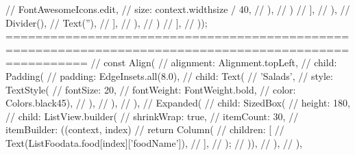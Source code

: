 //                           FontAwesomeIcons.edit,
//                           size: context.widthsize / 40,
//                         ),
//                       )
//                     ],
//                   ),
//                   Divider(),
//                   Text(''),
//                 ],
//               ),
//             )
//           ],
//         ));
=======================================================================================================
// const Align(
                //   alignment: Alignment.topLeft,
                //   child: Padding(
                //     padding: EdgeInsets.all(8.0),
                //     child: Text(
                //       'Salads',
                //       style: TextStyle(
                //           fontSize: 20,
                //           fontWeight: FontWeight.bold,
                //           color: Colors.black45),
                //     ),
                //   ),
                // ),
                // Expanded(
                //   child: SizedBox(
                //     height: 180,
                //     child: ListView.builder(
                //         shrinkWrap: true,
                //         itemCount: 30,
                //         itemBuilder: ((context, index) {
                //           return Column(
                //             children: [
                //               Text(ListFoodata.food[index]['foodName']),
                //             ],
                //           );
                //         })),
                //   ),
                // ),